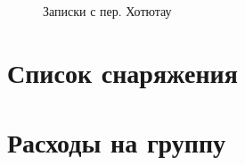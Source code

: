 \documentclass[a4paper, 12pt]{report}
\begin{document}
\begin{figure}[h]
\begin{minipage}[h]{0.325\linewidth}
	\end{minipage}
	\caption{Записки с пер. Хотютау}
	\label{pic:hotyutau}
\end{figure}

\section{Список снаряжения}
\section{Расходы на группу}



\end{document}
